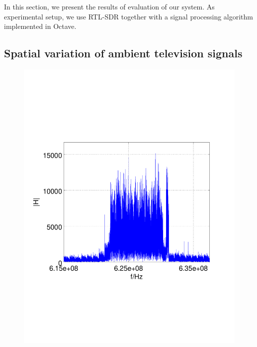 
In this section, we present the results of evaluation of our system. As experimental 
setup, we use RTL-SDR together with a signal processing algorithm implemented
in Octave. 

\subsection{Spatial variation of ambient television signals}

\vspace{-8mm}
\begin{figure}[h]
	\centering
	\begin{minipage}{0.49\columnwidth}
	\includegraphics[width=\columnwidth]{./fig/626mhz_raw}
	\end{minipage}
	\hfill
	\begin{minipage}{0.49\columnwidth}

\end{minipage}
\end{figure}
